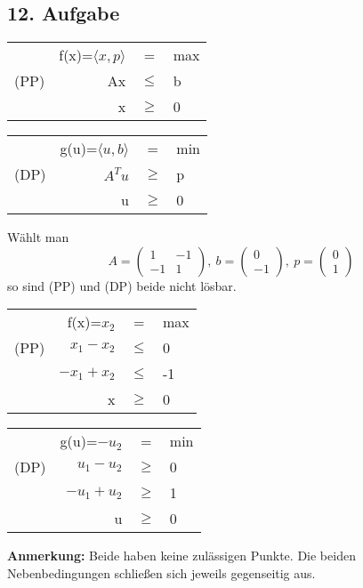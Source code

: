 \documentclass[a4paper,11pt,twoside,titlepage]{article}
\begin{document}
\subsection*{12. Aufgabe}
\begin{center}
\begin{tabular}{c|rcl|}\cline{2-4}
~~~&f(x)=$\langle x,p\rangle$&=&max\\
(PP)&Ax&$\leq$&b\\
&x&$\geq$&0\\\cline{2-4}
\end{tabular}
\begin{tabular}{c|rcl|}\cline{2-4}
~~~&g(u)=$\langle u,b\rangle$&=&min\\
(DP)&$A^Tu$&$\geq$&p\\
&u&$\geq$&0\\\cline{2-4}
\end{tabular}
\end{center}
Wählt man 
\[A=\begin{pmatrix} 1&-1  \\ -1&1 \end{pmatrix},\ b=\begin{pmatrix} 0\\-1\end{pmatrix},\ p=\begin{pmatrix}0\\1\end{pmatrix}\]
so sind (PP) und (DP) beide nicht lösbar. 
\begin{center}
\begin{tabular}{c|rcl|}\cline{2-4}
~~~&f(x)=$x_2$&=&max\\
(PP)&$x_1-x_2$&$\leq$&0\\
&$-x_1+x_2$&$\leq$&-1\\
&x&$\geq$&0\\\cline{2-4}
\end{tabular}
\begin{tabular}{c|rcl|}\cline{2-4}
~~~&g(u)=$-u_2$&=&min\\
(DP)&$u_1-u_2$&$\geq$&0\\
&$-u_1+u_2$&$\geq$&1\\
&u&$\geq$&0\\\cline{2-4}
\end{tabular}
\end{center}

\textbf{Anmerkung:} Beide haben keine zulässigen Punkte. Die beiden Nebenbedingungen schließen sich jeweils gegenseitig aus.


\newpage
\end{document}
